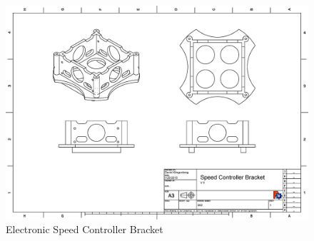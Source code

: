 \documentclass[pdftex,11pt]{article}
\begin{document}
\begin{figure}[!h]
	\centering
		\includegraphics[width=1\textwidth]{./graphics/SpeedBracket.eps}
	\caption{Electronic Speed Controller Bracket}
	\label{fig:partbin}
\end{figure}
\end{document}

